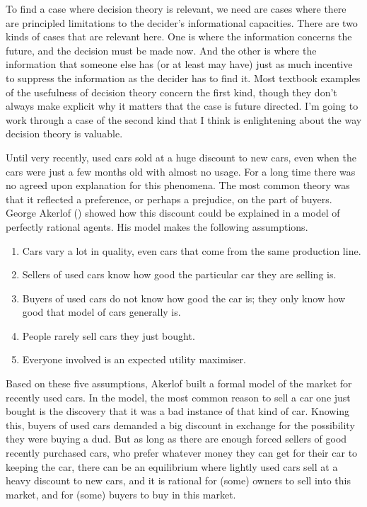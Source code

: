 \documentclass[
  11pt,
  letterpaper,
  DIV=11,
  numbers=noendperiod,
  twoside]{scrartcl}
\providecommand{\tightlist}{%
  \setlength{\itemsep}{0pt}\setlength{\parskip}{0pt}}
\begin{document}
To find a case where decision theory is relevant, we need are cases
where there are principled limitations to the decider's informational
capacities. There are two kinds of cases that are relevant here. One is
where the information concerns the future, and the decision must be made
now. And the other is where the information that someone else has (or at
least may have) just as much incentive to suppress the information as
the decider has to find it. Most textbook examples of the usefulness of
decision theory concern the first kind, though they don't always make
explicit why it matters that the case is future directed. I'm going to
work through a case of the second kind that I think is enlightening
about the way decision theory is valuable.

Until very recently, used cars sold at a huge discount to new cars, even
when the cars were just a few months old with almost no usage. For a
long time there was no agreed upon explanation for this phenomena. The
most common theory was that it reflected a preference, or perhaps a
prejudice, on the part of buyers. George Akerlof
() showed how this discount could be
explained in a model of perfectly rational agents. His model makes the
following assumptions.

\begin{enumerate}
\def\labelenumi{\arabic{enumi}.}
\tightlist
\item
  Cars vary a lot in quality, even cars that come from the same
  production line.
\item
  Sellers of used cars know how good the particular car they are selling
  is.
\item
  Buyers of used cars do not know how good the car is; they only know
  how good that model of cars generally is.
\item
  People rarely sell cars they just bought.
\item
  Everyone involved is an expected utility maximiser.
\end{enumerate}

Based on these five assumptions, Akerlof built a formal model of the
market for recently used cars. In the model, the most common reason to
sell a car one just bought is the discovery that it was a bad instance
of that kind of car. Knowing this, buyers of used cars demanded a big
discount in exchange for the possibility they were buying a dud. But as
long as there are enough forced sellers of good recently purchased cars,
who prefer whatever money they can get for their car to keeping the car,
there can be an equilibrium where lightly used cars sell at a heavy
discount to new cars, and it is rational for (some) owners to sell into
this market, and for (some) buyers to buy in this market.
\end{document}

